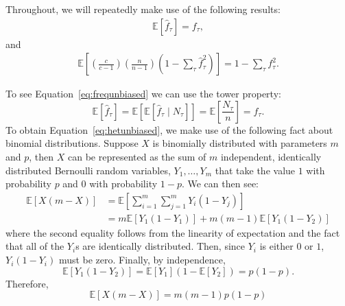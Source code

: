 \documentclass[letterpaper,fontsize=9pt,DIV=12]{scrartcl}
\newcommand{\samplesize}{n}
\newcommand{\readdepth}{c}
\newcommand{\empfreq}{\widehat{f}}
\begin{document}
Throughout, we will repeatedly make use of the following results:
\begin{align}
\mathbb{E}\left[\empfreq_\tau\right] = f_\tau, \label{eq:frequnbiased}
\end{align}
and
\begin{align}
\mathbb{E}\left[\left(\frac{\readdepth}{\readdepth-1}\right)\left(\frac{\samplesize}{\samplesize-1}\right)\left(1-\sum_\tau\empfreq_\tau^2\right)\right] = 1-\sum_\tau f_\tau^2. \label{eq:hetunbiased}
\end{align}

To see Equation~\ref{eq:frequnbiased} we can use the tower property:
\[
\mathbb{E}\left[\empfreq_\tau\right] = \mathbb{E}\left[\mathbb{E}\left[\empfreq_\tau \mid N_\tau \right]\right] = \mathbb{E}\left[\frac{N_\tau}{n}\right] = f_\tau.
\]
To obtain Equation~\ref{eq:hetunbiased}, we make use of the following fact about binomial distributions.  Suppose $X$ is binomially distributed with parameters $m$ and $p$, then $X$ can be represented as the sum of $m$ independent, identically distributed Bernoulli random variables, $Y_1,\ldots,Y_m$ that take the value $1$ with probability $p$ and $0$ with probability $1-p$.  We can then see:
\begin{align*}
\mathbb{E}\left[X(m-X)\right] &= \mathbb{E}\left[\sum_{i=1}^m\sum_{j=1}^mY_i(1-Y_j)\right]\\
&= m\mathbb{E}\left[Y_1(1-Y_1)\right] + m(m-1)\mathbb{E}\left[Y_1(1-Y_2)\right]
\end{align*}
where the second equality follows from the linearity of expectation and the fact that all of the $Y_i$s are identically distributed.  Then, since $Y_i$ is either $0$ or $1$, $Y_i(1-Y_i)$ must be zero.  Finally, by independence,
\[
\mathbb{E}\left[Y_1(1-Y_2)\right] = \mathbb{E}\left[Y_1\right]\left(1-\mathbb{E}\left[Y_2\right]\right) = p(1-p).
\]
Therefore,
\[
\mathbb{E}\left[X(m-X)\right]  = m(m-1)p(1-p)
\]
\end{document}
